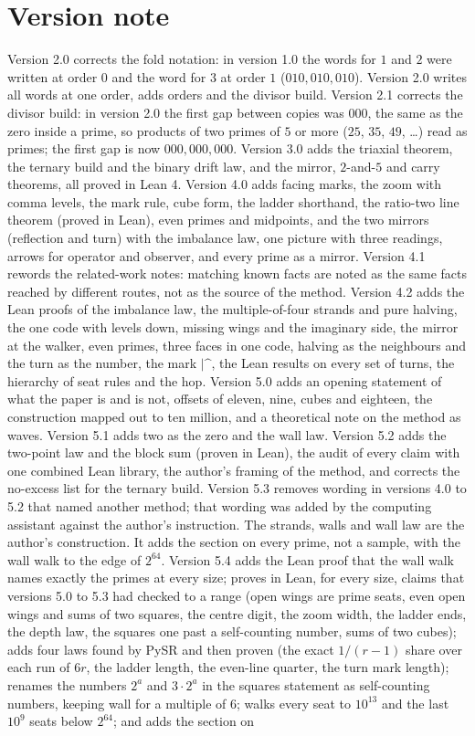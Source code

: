 \documentclass[11pt]{article}
\begin{document}
\section*{Version note}
Version 2.0 corrects the fold notation: in version 1.0 the words for $1$ and $2$ were written at order $0$ and the word for $3$ at order $1$ ($010,010,010$). Version 2.0 writes all words at one order, adds orders and the divisor build. Version 2.1 corrects the divisor build: in version 2.0 the first gap between copies was $000$, the same as the zero inside a prime, so products of two primes of $5$ or more ($25$, $35$, $49$, \dots) read as primes; the first gap is now $000,000,000$. Version 3.0 adds the triaxial theorem, the ternary build and the binary drift law, and the mirror, $2$-and-$5$ and carry theorems, all proved in Lean 4. Version 4.0 adds facing marks, the zoom with comma levels, the mark rule, cube form, the ladder shorthand, the ratio-two line theorem (proved in Lean), even primes and midpoints, and the two mirrors (reflection and turn) with the imbalance law, one picture with three readings, arrows for operator and observer, and every prime as a mirror. Version 4.1 rewords the related-work notes: matching known facts are noted as the same facts reached by different routes, not as the source of the method. Version 4.2 adds the Lean proofs of the imbalance law, the multiple-of-four strands and pure halving, the one code with levels down, missing wings and the imaginary side, the mirror at the walker, even primes, three faces in one code, halving as the neighbours and the turn as the number, the mark $|\text{\textasciicircum}$, the Lean results on every set of turns, the hierarchy of seat rules and the hop. Version 5.0 adds an opening statement of what the paper is and is not, offsets of eleven, nine, cubes and eighteen, the construction mapped out to ten million, and a theoretical note on the method as waves. Version 5.1 adds two as the zero and the wall law. Version 5.2 adds the two-point law and the block sum (proven in Lean), the audit of every claim with one combined Lean library, the author's framing of the method, and corrects the no-excess list for the ternary build. Version 5.3 removes wording in versions 4.0 to 5.2 that named another method; that wording was added by the computing assistant against the author's instruction. The strands, walls and wall law are the author's construction. It adds the section on every prime, not a sample, with the wall walk to the edge of $2^{64}$. Version 5.4 adds the Lean proof that the wall walk names exactly the primes at every size; proves in Lean, for every size, claims that versions 5.0 to 5.3 had checked to a range (open wings are prime seats, even open wings and sums of two squares, the centre digit, the zoom width, the ladder ends, the depth law, the squares one past a self-counting number, sums of two cubes); adds four laws found by PySR and then proven (the exact $1/(r-1)$ share over each run of $6r$, the ladder length, the even-line quarter, the turn mark length); renames the numbers $2^a$ and $3\cdot2^a$ in the squares statement as self-counting numbers, keeping wall for a multiple of $6$; walks every seat to $10^{13}$ and the last $10^9$ seats below $2^{64}$; and adds the section on 
\end{document}
